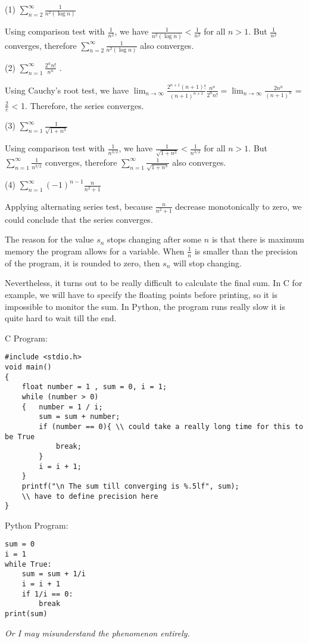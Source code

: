 \begin{numedquestion}
(1) $\sum_{n=2}^{\infty} \frac{1}{n^{2}(\log n)}$ 

Using comparison test with $\frac{1}{n^2}$, we have $\frac{1}{n^{2}(\log n)} < \frac{1}{n^2}$ for all $n > 1$. But $\frac{1}{n^2}$ converges, therefore $\sum_{n=2}^{\infty} \frac{1}{n^{2}(\log n)}$  also converges.

(2) $\sum_{n=1}^{\infty} \frac{2^{n} n !}{n^{n}}$ .

Using Cauchy’s root test, we have $\lim_{n \rightarrow \infty} \frac{2^{n+1} (n+1) !}{(n+1)^{n+1}}\frac{n^{n}}{2^{n} n !}  = \lim_{n \rightarrow \infty}\frac{2n^{n}}{(n+1)^n}$ = $\frac{2}{e}$ < 1. Therefore, the series converges.  

(3) $\sum_{n=1}^{\infty} \frac{1}{\sqrt{1+n^{3}}}$ 

Using comparison test with $\frac{1}{n^{3/2}}$, we have $\frac{1}{\sqrt{1+n^{3}}} < \frac{1}{n^{3/2}}$ for all $n > 1$. But $\sum_{n=1}^{\infty} \frac{1}{n^{3/2}}$ converges, therefore $\sum_{n=1}^{\infty} \frac{1}{\sqrt{1+n^{3}}}$  also converges.

(4) $\sum_{n=1}^{\infty}(-1)^{n-1} \frac{n}{n^{2}+1}$ 

Applying alternating series test, because $\frac{n}{n^{2}+1}$ decrease monotonically to zero, we could conclude that the series converges. 
\end{numedquestion}

\begin{numedquestion}
The reason for the value $s_{n}$ stops changing after some $n$ is that there is maximum memory the program allows for a variable. When $\frac{1}{n}$ is smaller than the precision of the program, it is rounded to zero, then $s_{n}$ will stop changing. 

Nevertheless, it turns out to be really difficult to calculate the final sum. In C for example, we will have to specify the floating points before printing, so it is impossible to monitor the sum. In Python, the program runs really slow it is quite hard to wait till the end. 

C Program:
\begin{verbatim}
#include <stdio.h>
void main()
{
    float number = 1 , sum = 0, i = 1;
    while (number > 0)
    {   number = 1 / i;
        sum = sum + number;
        if (number == 0){ \\ could take a really long time for this to be True
            break;
        }
        i = i + 1;       
    }
    printf("\n The sum till converging is %.5lf", sum); 
    \\ have to define precision here
}
\end{verbatim}
Python Program: 
\begin{verbatim}
sum = 0
i = 1
while True:
    sum = sum + 1/i
    i = i + 1
    if 1/i == 0: 
        break
print(sum)
\end{verbatim}

\emph{Or I may misunderstand the phenomenon entirely. }
\end{numedquestion}

